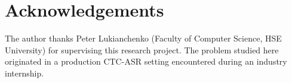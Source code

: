 \documentclass{article}
\begin{document}
\section*{Acknowledgements}
The author thanks Peter Lukianchenko (Faculty of Computer Science, HSE
University) for supervising this research project. The problem studied here
originated in a production CTC-ASR setting encountered during an industry
internship.




\appendix



\end{document}
